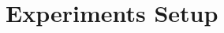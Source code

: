 \documentclass[../main.tex]{subfiles}
\begin{document}
\footnotesize
\section{Experiments Setup}

\lipsum[2-4]
\end{document}
